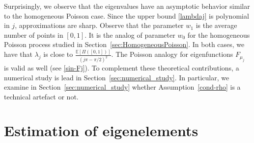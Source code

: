 \documentclass[aos]{imsart}
\theoremstyle{plain}
\theoremstyle{remark}
\newcommand{\1}{1}
\begin{document}
Surprisingly, we observe that the eigenvalues have an asymptotic behavior similar to the homogeneous Poisson case. Since the upper bound \eqref{lambdaj} is polynomial in $j$, approximations are sharp. Observe that the parameter $w_1$ is the average number of points in $[0, 1]$. It is the analog of parameter $w_0$ for the homogeneous Poisson process studied in Section~\ref{sec:HomogeneousPoisson}. In both cases, we have that $\lambda_j$ is close to $\frac{{\mathbb E}[\Pi([0,1])]}{(j\pi-\pi/2)^2}.$ The Poisson analogy for eigenfunctions $F_{\mu_j}$ is valid as well (see \eqref{sin-Fj}). To complement these theoretical contributions, a numerical study is lead in Section~\ref{sec:numerical_study}. In particular, we examine in Section~\ref{sec:numerical_study} whether Assumption~\eqref{cond-rho} is a technical artefact or not.


\section{Estimation of eigenelements}\label{sec:RMPC}
\end{document}
